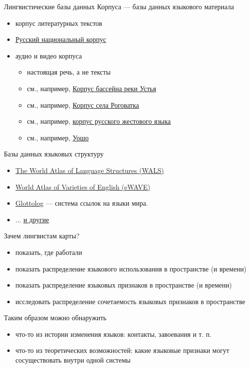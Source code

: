 \documentclass[13pt, t]{beamer}
\begin{document}

\begin{frame}{Лингвистические базы данных}
\alert{\large Корпуса --- базы данных языкового материала}
\begin{itemize}
\item корпус литературных текстов
\item \href{http://ruscorpora.ru/}{Русский национальный корпус}
\item аудио и видео корпуса \pause
\begin{itemize}
\item настоящая речь, а не тексты
\item см., например, \href{http://www.parasolcorpus.org/Pushkino/login.php}{Корпус бассейна реки Устья}
\item см., например, \href{http://www.parasolcorpus.org/Rogovatka/}{Корпус села Роговатка}
\item см., например, \href{http://rsl.nstu.ru}{корпус русского жестового языка}
\item см., например, \href{https://www.youtube.com/watch?v=OUwOvF7TqgA&feature=youtu.be&t=1m25s}{Уошо}
\end{itemize}
\end{itemize}
\vfill
\alert{\large Базы данных языковых структуру}
\begin{itemize}
\item \href{https://wals.info/}{The World Atlas of Language Structures (WALS)}
\item \href{https://ewave-atlas.org/}{World Atlas of Varieties of English (eWAVE)}
\item \href{https://glottolog.org/}{Glottolog} --- система ссылок на языки мира.
\item ... \href{https://clld.org/datasets.html}{и другие}
\end{itemize}
\end{frame}

\begin{frame}{Зачем лингвистам карты?}
\begin{itemize}
\item показать, где работали
\item показать распределение языкового использования в пространстве (и времени)
\item показать распределение языковых признаков в пространстве (и времени)
\item исследовать распределение сочетаемость языковых признаков в пространстве
\end{itemize}
\vfill
Таким образом можно обнаружить
\begin{itemize}
\item что-то из истории изменения языков: контакты, завоевания и т. п.
\item что-то из теоретических возможностей: какие языковые признаки могут сосуществовать внутри одной системы
\end{itemize}


\end{frame}
\end{document}
